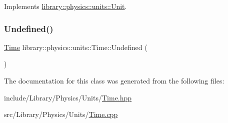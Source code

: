 Implements \hyperlink{classlibrary_1_1physics_1_1units_1_1_unit_ad7364d457300e36413323c4aebce8029}{library\+::physics\+::units\+::\+Unit}.

\mbox{\label{classlibrary_1_1physics_1_1units_1_1_time_a532c992968408dcb70f5ee94e672c595}} 
\subsubsection{\texorpdfstring{Undefined()}{Undefined()}}
{\footnotesize\ttfamily \hyperlink{classlibrary_1_1physics_1_1units_1_1_time}{Time} library\+::physics\+::units\+::\+Time\+::\+Undefined (\begin{DoxyParamCaption}{ }\end{DoxyParamCaption})\hspace{0.3cm}{\ttfamily [static]}}



The documentation for this class was generated from the following files\+:\begin{DoxyCompactItemize}
\item 
include/\+Library/\+Physics/\+Units/\hyperlink{_units_2_time_8hpp}{Time.\+hpp}\item 
src/\+Library/\+Physics/\+Units/\hyperlink{_units_2_time_8cpp}{Time.\+cpp}\end{DoxyCompactItemize}

